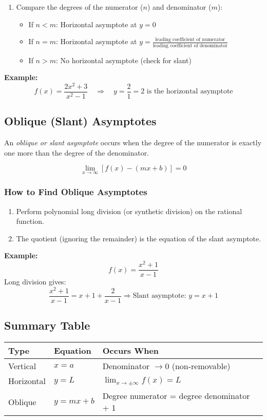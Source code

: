 \begin{enumerate}
    \item Compare the degrees of the numerator (\(n\)) and denominator (\(m\)):
    \begin{itemize}[label=\(-\)]
        \item If \(n < m\): Horizontal asymptote at \(y = 0\)
        \item If \(n = m\): Horizontal asymptote at \(y = \frac{\text{leading coefficient of numerator}}{\text{leading coefficient of denominator}}\)
        \item If \(n > m\): No horizontal asymptote (check for slant)
    \end{itemize}
\end{enumerate}

\textbf{Example:}
\[
f(x) = \frac{2x^2 + 3}{x^2 - 1} \quad \Rightarrow \quad y = \frac{2}{1} = 2 \text{ is the horizontal asymptote}
\]

\subsection{Oblique (Slant) Asymptotes}

An \emph{oblique or slant asymptote} occurs when the degree of the numerator is exactly one more than the degree of the denominator.

\[
\lim_{x \to \infty} [f(x) - (mx + b)] = 0
\]

\subsubsection{How to Find Oblique Asymptotes}

\begin{enumerate}
    \item Perform polynomial long division (or synthetic division) on the rational function.
    \item The quotient (ignoring the remainder) is the equation of the slant asymptote.
\end{enumerate}

\textbf{Example:}
\[
f(x) = \frac{x^2 + 1}{x - 1}
\]
Long division gives:
\[
\frac{x^2 + 1}{x - 1} = x + 1 + \frac{2}{x - 1}
\Rightarrow \text{Slant asymptote: } y = x + 1
\]

\subsection{Summary Table}

\begin{center}
\begin{tabular}{|l|l|l|}
\hline
\textbf{Type} & \textbf{Equation} & \textbf{Occurs When} \\
\hline
Vertical      & \(x = a\)           & Denominator \(\to 0\) (non-removable) \\
Horizontal    & \(y = L\)           & \(\lim_{x \to \pm \infty} f(x) = L\) \\
Oblique       & \(y = mx + b\)      & Degree numerator = degree denominator + 1 \\
\hline
\end{tabular}
\end{center}
